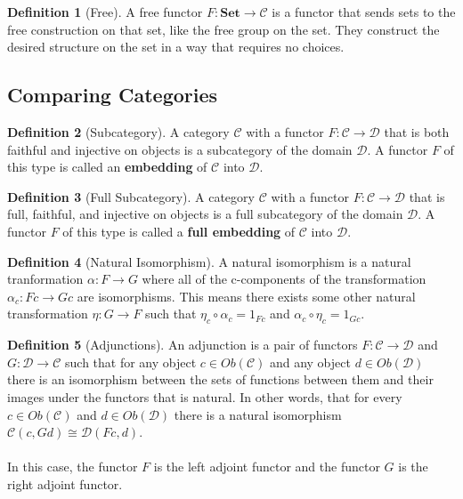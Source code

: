 \documentclass{article}
\theoremstyle{definition}
\newtheorem{definition}{Definition}
\begin{document}
\begin{definition}[Free]
    A free functor $F:\mathbf{Set}\rightarrow\mathcal{C}$ is a functor that sends sets to the free construction on that set, like the free group on the set.
    They construct the desired structure on the set in a way that requires no choices.
\end{definition}



\subsection*{Comparing Categories}

\begin{definition}[Subcategory]
    A category $\mathcal{C}$ with a functor $F:\mathcal{C}\rightarrow\mathcal{D}$ that is both faithful and injective on objects is a subcategory of the domain $\mathcal{D}$.
    A functor $F$ of this type is called an \textbf{embedding} of $\mathcal{C}$ into $\mathcal{D}$.
\end{definition}


\begin{definition}[Full Subcategory]
    A category $\mathcal{C}$ with a functor $F:\mathcal{C}\rightarrow\mathcal{D}$ that is full, faithful, and injective on objects is a full subcategory of the domain $\mathcal{D}$.
    A functor $F$ of this type is called a \textbf{full embedding} of $\mathcal{C}$ into $\mathcal{D}$.
\end{definition}


\begin{definition}[Natural Isomorphism]
    A natural isomorphism is a natural tranformation $\alpha:F\rightarrow G$ where all of the c-components of the transformation $\alpha_{c}:Fc\rightarrow Gc$ are isomorphisms.
    This means there exists some other natural transformation $\eta:G\rightarrow F$ such that $\eta_c\circ\alpha_c = 1_{Fc}$ and $\alpha_c\circ\eta_c = 1_{Gc}$.
\end{definition}

\color{blue}
\begin{definition}[Adjunctions]
    An adjunction is a pair of functors $F:\mathcal{C}\rightarrow\mathcal{D}$ and $G:\mathcal{D}\rightarrow\mathcal{C}$ such that for any object $c\in Ob(\mathcal{C})$ and any object $d\in Ob(\mathcal{D})$ there is an isomorphism between the sets of functions between them and their images under the functors that is natural.
    In other words, that for every $c\in Ob(\mathcal{C})$ and $d\in Ob(\mathcal{D})$ there is a natural isomorphism $\mathcal{C}(c,Gd)\cong\mathcal{D}(Fc,d)$.\\\\
    In this case, the functor $F$ is the left adjoint functor and the functor $G$ is the right adjoint functor.
\end{definition}
\end{document}
